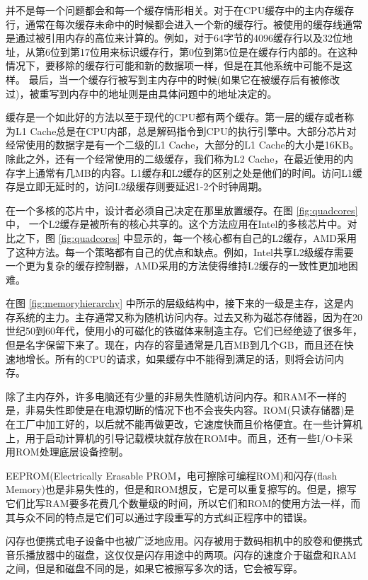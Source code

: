 	并不是每一个问题都会和每一个缓存情形相关。对于在CPU缓存中的主内存缓存行，通常在每次缓存未命中的时候都会进入一个新的缓存行。被使用的缓存线通常是通过被引用内存的高位来计算的。例如，对于64字节的4096缓存行以及32位地址，从第6位到第17位用来标识缓存行，第0位到第5位是在缓存行内部的。在这种情况下，要移除的缓存行可能和新的数据项一样，但是在其他系统中可能不是这样。
	最后，当一个缓存行被写到主内存中的时候(如果它在被缓存后有被修改过)，被重写到内存中的地址则是由具体问题中的地址决定的。
	
	缓存是一个如此好的方法以至于现代的CPU都有两个缓存。第一层的缓存或者称为L1 Cache总是在CPU内部，总是解码指令到CPU的执行引擎中。大部分芯片对经常使用的数据字是有一个二级的L1 Cache，大部分的L1 Cache的大小是16KB。除此之外，还有一个经常使用的二级缓存，我们称为L2 Cache，在最近使用的内存字上通常有几MB的内容。L1缓存和L2缓存的区别之处是他们的时间。访问L1缓存是立即无延时的，访问L2级缓存则要延迟1-2个时钟周期。
	
	在一个多核的芯片中，设计者必须自己决定在那里放置缓存。在图 \ref{fig:quadcores} 中， 一个L2缓存是被所有的核心共享的。这个方法应用在Intel的多核芯片中。对比之下，图 \ref{fig:quadcores} 中显示的，每一个核心都有自己的L2缓存，AMD采用了这种方法。每一个策略都有自己的优点和缺点。例如，Intel共享L2级缓存需要一个更为复杂的缓存控制器，AMD采用的方法使得维持L2缓存的一致性更加地困难。
	
	在图 \ref{fig:memoryhierarchy} 中所示的层级结构中，接下来的一级是主存，这是内存系统的主力。主存通常又称为随机访问内存。过去又称为磁芯存储器，因为在20世纪50到60年代，使用小的可磁化的铁磁体来制造主存。它们已经绝迹了很多年，但是名字保留下来了。现在，内存的容量通常是几百MB到几个GB，而且还在快速地增长。所有的CPU的请求，如果缓存中不能得到满足的话，则将会访问内存。
	
	除了主内存外，许多电脑还有少量的非易失性随机访问内存。和RAM不一样的是，非易失性即使是在电源切断的情况下也不会丧失内容。ROM(只读存储器)是在工厂中加工好的，以后就不能再做更改，它速度快而且价格便宜。在一些计算机上，用于启动计算机的引导记载模块就存放在ROM中。而且，还有一些I/O卡采用ROM处理底层设备控制。
	
	EEPROM(Electrically Erasable PROM，电可擦除可编程ROM)和闪存(flash Memory)也是非易失性的，但是和ROM想反，它是可以重复擦写的。但是，擦写它们比写RAM要多花费几个数量级的时间，所以它们和ROM的使用方法一样，而其与众不同的特点是它们可以通过字段重写的方式纠正程序中的错误。
	
	闪存也便携式电子设备中也被广泛地应用。闪存被用于数码相机中的胶卷和便携式音乐播放器中的磁盘，这仅仅是闪存用途中的两项。闪存的速度介于磁盘和RAM之间，但是和磁盘不同的是，如果它被擦写多次的话，它会被写穿。
	
